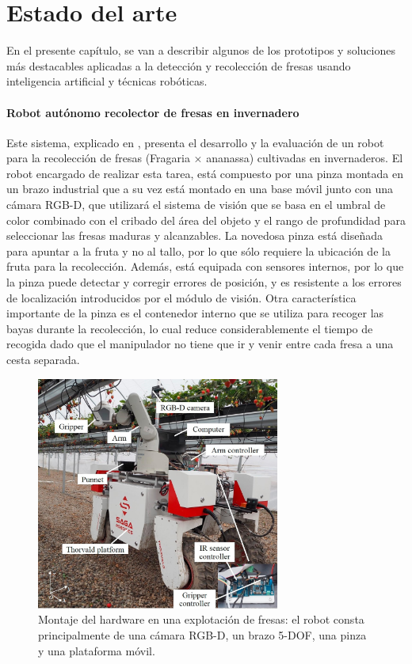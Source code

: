 \chapter{Estado del arte}
\label{cap:capitulo2}
	
En el presente capítulo, se van a describir algunos de los prototipos y soluciones más destacables aplicadas a la detección y recolección de fresas usando inteligencia artificial y técnicas robóticas.

\subsubsection{Robot autónomo recolector de fresas en invernadero}
Este sistema, explicado en \cite{Xiong19}, presenta el desarrollo y la evaluación de un robot para la recolección de fresas (Fragaria × ananassa) cultivadas en invernaderos. El robot encargado de realizar esta tarea, está compuesto por una pinza montada en un brazo industrial que a su vez está montado en una base móvil junto con una cámara RGB-D, que utilizará el sistema de visión que se basa en el umbral de color combinado con el cribado del área del objeto y el rango de profundidad para seleccionar las fresas maduras y alcanzables. La novedosa pinza está diseñada para apuntar a la fruta y no al tallo, por lo que sólo requiere la ubicación de la fruta para la recolección. Además, está equipada con sensores internos, por lo que la pinza puede detectar y corregir errores de posición, y es resistente a los errores de localización introducidos por el módulo de visión. Otra característica importante de la pinza es el contenedor interno que se utiliza para recoger las bayas durante la recolección, lo cual reduce considerablemente el tiempo de recogida dado que el manipulador no tiene que ir y venir entre cada fresa a una cesta separada.

\begin{figure} [h!]
    \begin{center}
      \includegraphics[width=8cm]{figs/Hardware assembly in a strawberry farm.jpg}
    \end{center}
    \caption{Montaje del hardware en una explotación de fresas: el robot consta principalmente de una cámara RGB-D, un brazo 5-DOF, una pinza y una plataforma móvil.}
    \label{fig:Robot_Xiong}
\end{figure}
\pagebreak


